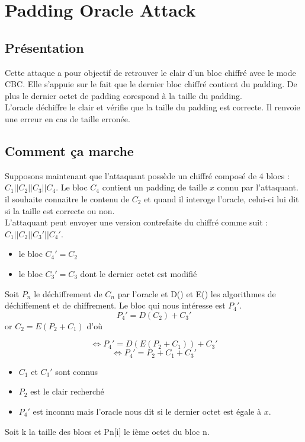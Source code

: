 
\chapter{Padding Oracle Attack}
\label{chapter:POA}

\section{Présentation}
\label{sec:pPOA}

Cette attaque a pour objectif de retrouver le clair d'un bloc chiffré 
avec le mode CBC\up{\ref{fig:cbc}}. Elle s'appuie sur le fait que le dernier bloc chiffré
contient du padding. De plus le dernier octet de padding corespond à la
taille du padding.\\
L'oracle  déchiffre le clair et vérifie que la taille du padding est correcte. 
Il renvoie une erreur en cas de taille erronée.\\

\section{Comment ça marche}
\label{sec:ccmPOA}

Supposons maintenant que l'attaquant possède un chiffré composé de 4 blocs :
$C_1||C_2||C_3||C_4$. Le bloc $C_4$ contient un padding de taille $x$ connu par l'attaquant.
il souhaite connaitre le contenu de $C_2$ et quand il interoge l'oracle, celui-ci lui dit
si la taille est correcte ou non.\\
L'attaquant peut envoyer une version contrefaite du chiffré comme suit :
$C_1||C_2||C_3'||C_4'$.\\
\begin{itemize}
\item le bloc $C_4'=C_2$
\item le bloc $C_3'= C_3$ dont le dernier octet est modifié
\end{itemize}
Soit $P_n$ le déchiffrement de $C_n$ par l'oracle et D() et E() les algorithmes
de déchiffement et de chiffrement. 
Le bloc qui nous intéresse est $P_4'$.
\[P_4' = D(C_2) + C_3'\]
or $C_2 = E(P_2 + C_1)$ d'où

\[\Longleftrightarrow P_4' = D(E(P_2 + C_1)) + C_3'\]
\[\Longleftrightarrow P_4' = P_2 + C_1 + C_3'\]
\begin{itemize}
\item $C_1$ et $C_3'$ sont connus
\item $P_2$ est le clair recherché
\item $P_4'$ est inconnu mais l'oracle nous dit si le dernier octet est égale à $x$.
\end{itemize}
Soit k la taille des blocs et Pn[i] le ième octet du bloc n.

